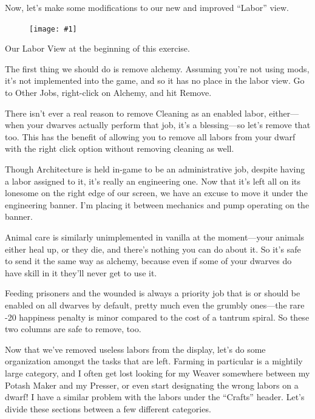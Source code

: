 \documentclass[]{article}
\newcommand{\fullfigure}[1] {
\begin{figure}[h!]
\texttt{[image: \#1]}
\end{figure}
}
\newcommand{\fullfigurecaption}[1] {
\begin{center}
\vspace{-12pt}
#1
\end{center}
}
\begin{document}
Now, let's make some modifications to our new and improved ``Labor'' view.

\fullfigure{Sec3Fig17}
\fullfigurecaption{Our Labor View at the beginning of this exercise.}

The first thing we should do is remove alchemy. Assuming you're not using mods, it's not implemented into
the game, and so it has no place in the labor view. Go to Other Jobs, right-click on Alchemy, and hit
Remove.
\vspace{12pt}

There isn't ever a real reason to remove Cleaning as an enabled labor, either---when your dwarves
actually perform that job, it's a blessing---so let's remove that too. This has the benefit of allowing
you to remove all labors from your dwarf with the right click option without removing cleaning as well.
\vspace{12pt}

Though Architecture is held in-game to be an administrative job, despite having a labor assigned to it,
it's really an engineering one. Now that it's left all on its lonesome on the right edge of our screen,
we have an excuse to move it under the engineering banner. I'm placing it between mechanics and pump
operating on the banner.
\vspace{12pt}

Animal care is similarly unimplemented in vanilla at the moment---your animals either heal up, or they
die, and there's nothing you can do about it. So it's safe to send it the same way as alchemy, because
even if some of your dwarves do have skill in it they'll never get to use it.
\vspace{12pt}

Feeding prisoners and the wounded is always a priority job that is or should be enabled on all dwarves by
default, pretty much even the grumbly ones---the rare -20 happiness penalty is minor compared to the cost
of a tantrum spiral. So these two columns are safe to remove, too.
\vspace{12pt}

Now that we've removed useless labors from the display, let's do some organization amongst the tasks that
are left. Farming in particular is a mightily large category, and I often get lost looking for my Weaver
somewhere between my Potash Maker and my Presser, or even start designating the wrong labors on a dwarf!
I have a similar problem with the labors under the ``Crafts'' header. Let's divide these sections between a
few different categories.
\vspace{12pt}
\end{document}
